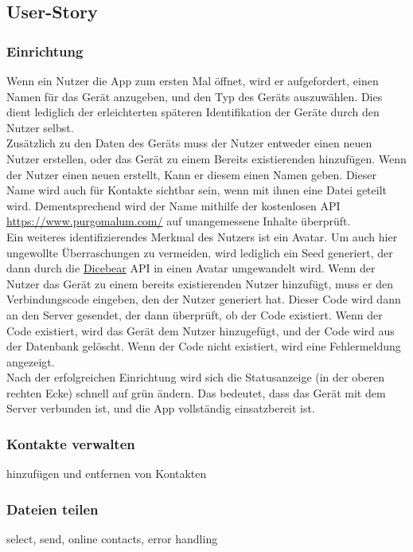 \documentclass[a4paper]{article}
\begin{document}
\subsection{User-Story}

\subsubsection{Einrichtung}
Wenn ein Nutzer die App zum ersten Mal öffnet, wird er aufgefordert, einen Namen
für das Gerät anzugeben, und den Typ des Geräts auszuwählen. Dies dient
lediglich der erleichterten späteren Identifikation der Geräte durch den Nutzer
selbst.\\
Zusätzlich zu den Daten des Geräts muss der Nutzer entweder einen neuen Nutzer
erstellen, oder das Gerät zu einem Bereits existierenden hinzufügen. Wenn der
Nutzer einen neuen erstellt, Kann er diesem einen Namen geben. Dieser Name wird
auch für Kontakte sichtbar sein, wenn mit ihnen eine Datei geteilt wird.
Dementsprechend wird der Name mithilfe der kostenlosen API \url{
https://www.purgomalum.com/} auf unangemessene Inhalte überprüft.\\
Ein weiteres identifizierendes Merkmal des Nutzers ist ein Avatar. Um auch hier
ungewollte Überraschungen zu vermeiden, wird lediglich ein Seed generiert, der
dann durch die \href{ https://www.dicebear.com/}{Dicebear} API in einen Avatar
umgewandelt wird. Wenn der Nutzer das Gerät zu einem bereits existierenden
Nutzer hinzufügt, muss er den Verbindungscode eingeben, den der Nutzer generiert
hat. Dieser Code wird dann an den Server gesendet, der dann überprüft, ob der
Code existiert. Wenn der Code existiert, wird das Gerät dem Nutzer hinzugefügt,
und der Code wird aus der Datenbank gelöscht. Wenn der Code nicht existiert,
wird eine Fehlermeldung angezeigt.\\
Nach der erfolgreichen Einrichtung wird sich die Statusanzeige (in der oberen
rechten Ecke) schnell auf grün ändern. Das bedeutet, dass das Gerät mit dem
Server verbunden ist, und die App vollständig einsatzbereit ist.

\subsubsection{Kontakte verwalten}

hinzufügen und entfernen von Kontakten

\subsubsection{Dateien teilen}
select, send, online contacts, error handling
\end{document}
